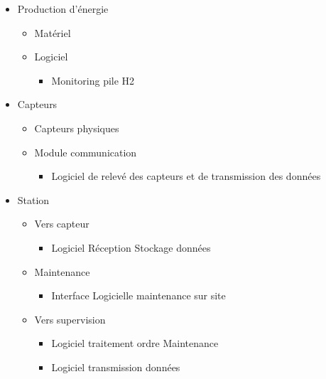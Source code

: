 \begin{itemize}
\item Production d’énergie

\begin{itemize}
\item Matériel
\item Logiciel

\begin{itemize}
\item Monitoring pile H2
\end{itemize}

\end{itemize}

\item Capteurs

\begin{itemize}
\item Capteurs physiques
\item Module communication

\begin{itemize}
\item Logiciel de relevé des capteurs et de transmission des données
\end{itemize}

\end{itemize}

\item Station

\begin{itemize}
\item Vers capteur

\begin{itemize}
\item Logiciel Réception Stockage données
\end{itemize}

\item Maintenance

\begin{itemize}
\item Interface Logicielle maintenance sur site
\end{itemize}

\item Vers supervision

\begin{itemize}
\item Logiciel traitement ordre Maintenance
\item Logiciel transmission données
\end{itemize}

\end{itemize}


\end{itemize}
